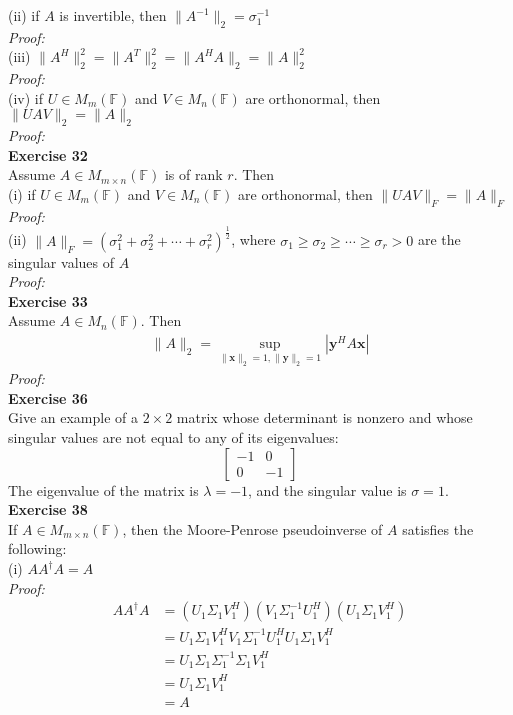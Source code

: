 \documentclass[letterpaper,12pt]{article}
\let\vec\mathbf
\theoremstyle{definition}
\begin{document}
(ii) if $A$ is invertible, then $\|A^{-1}\|_2 = \sigma_1^{-1}$ \\
\textit{Proof:} \\

(iii) $\|A^H\|_2^2 = \|A^T\|_2^2 = \|A^HA\|_2 = \|A\|_2^2$ \\
\textit{Proof:} \\

(iv) if $U \in M_m(\mathbb{F})$ and $V \in M_n(\mathbb{F})$ are orthonormal, then $\|UAV\|_2 = \|A\|_2$ \\
\textit{Proof:} \\

\textbf{Exercise 32} \\
Assume $A \in M_{m \times n}(\mathbb{F})$ is of rank $r$. Then \\
(i) if $U \in M_m(\mathbb{F})$ and $V \in M_n(\mathbb{F})$ are orthonormal, then $\|UAV\|_F = \|A\|_F$ \\
\textit{Proof:} \\

(ii) $\|A\|_F = (\sigma_1^2 + \sigma_2^2 + \cdots + \sigma_r^2) ^{\frac{1}{2}}$, where $\sigma_1 \geq \sigma_2 \geq \cdots \geq \sigma_r > 0$ are the singular values of $A$ \\
\textit{Proof:} \\

\textbf{Exercise 33} \\
Assume $A \in M_{n}(\mathbb{F})$. Then \\
\begin{align*}
  \|A\|_2 = \sup_{{\|\vec{x}\|_2=1}, {\|\vec{y}\|_2=1}} |\vec{y}^H A \vec{x}|
\end{align*}
\textit{Proof:} \\

\textbf{Exercise 36} \\
Give an example of a $2 \times 2$ matrix whose determinant is nonzero and whose singular values are not equal to any of its eigenvalues:
\[
\begin{bmatrix}
  -1 & 0 \\
  0 & -1
\end{bmatrix}
\]
The eigenvalue of the matrix is $\lambda = -1$, and the singular value is $\sigma = 1$. \\

\textbf{Exercise 38} \\
If $A \in M_{m \times n}(\mathbb{F})$, then the Moore-Penrose pseudoinverse of $A$ satisfies the following: \\
(i) $AA^\dagger A = A $ \\
\textit{Proof:}
\begin{align*}
  AA^\dagger A &= (U_1 \Sigma_1 V_1^H) (V_1 \Sigma_1^{-1} U_1^H) (U_1 \Sigma_1 V_1^H) \\
  &= U_1 \Sigma_1 V_1^H V_1 \Sigma_1^{-1} U_1^H U_1 \Sigma_1 V_1^H \\
  &= U_1 \Sigma_1 \Sigma_1^{-1} \Sigma_1 V_1^H \\
  &= U_1 \Sigma_1 V_1^H \\
  &= A
\end{align*}
\end{document}
